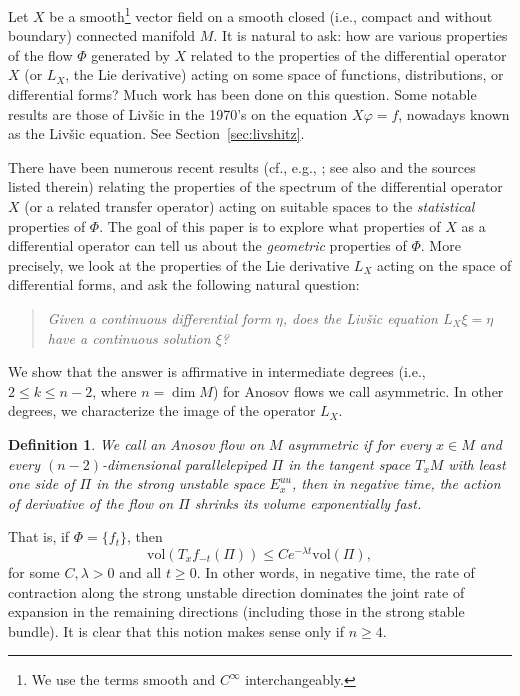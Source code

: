 \documentclass[11pt,letterpaper,reqno,abstract=true]{scrartcl}
\theoremstyle{plain}                              %
\newtheorem{defn}[thm]{Definition}
\theoremstyle{definition}                         %
\theoremstyle{remark}                             %
\begin{document}
Let $X$ be a smooth\footnote{We
  use the terms smooth and $C^\infty$ interchangeably.} vector field on a smooth closed (i.e., compact and without boundary) connected manifold $M$. It is natural to ask: how are various properties of the flow $\Phi$ generated by $X$ related to the properties of the differential operator $X$ (or $L_X$, the Lie derivative) acting on some space of functions, distributions, or differential forms? Much work has been done on this question. Some notable results are those of Liv\v{s}ic \cite{livsic+71, livsic+72} in the 1970's on the equation $X\varphi = f$, nowadays known as the \textsf{Liv\v{s}ic equation}. See Section~\ref{sec:livshitz}.

There have been numerous recent results (cf., e.g., \cite{faure+sjostrand+2011, G+L+P+2013, dyatlov+zworski+2016}; see also \cite{lefeuvre_book+2025} and the sources listed therein) relating the properties of the spectrum of the differential operator $X$ (or a related transfer operator) acting on suitable spaces to the \emph{statistical} properties of $\Phi$. The goal of this paper is to explore what properties of $X$ as a differential operator can tell us about the \emph{geometric} properties of $\Phi$. More precisely, we look at the properties of the Lie derivative $L_X$ acting on the space of differential forms, and ask the following natural question:

\begin{quote}
  \textit{Given a continuous differential form $\eta$, does the Liv\v{s}ic equation $L_X \xi = \eta$ have a continuous solution $\xi$?}
\end{quote}

We show that the answer is affirmative in intermediate degrees (i.e., $2 \leq k \leq n-2$, where $n = \dim M$) for Anosov flows we call asymmetric. In other degrees, we characterize the image of the operator $L_X$.

\begin{defn}
  We call an Anosov flow on $M$ \textsf{asymmetric} if for every $x \in M$ and every $(n-2)$-dimensional parallelepiped $\Pi$ in the tangent space $T_x M$ with least one side of $\Pi$ in the strong unstable space $E^{uu}_x$, then in negative time, the action of derivative of the flow on $\Pi$ shrinks its volume exponentially fast.
\end{defn}

That is, if $\Phi = \{ f_t \}$, then
%
\begin{displaymath}
  \text{vol}(T_x f_{-t}(\Pi)) \leq C e^{-\lambda t} \text{vol}(\Pi),
\end{displaymath}
%
for some $C, \lambda > 0$ and all $t \geq 0$. In other words, in negative time, the rate of contraction along the strong unstable direction dominates the joint rate of expansion in the remaining directions (including those in the strong stable bundle). It is clear that this notion makes sense only if $n \geq 4$.
\end{document}
